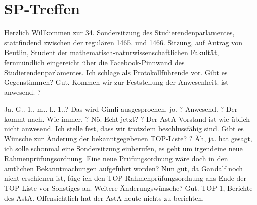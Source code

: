 \newpage
\section{SP-Treffen}
\label{sec:sp-treffen}
\charaktere{\Frodo, \Sum, \Gimli, \Legolars, \Elron, \Gandalf, \Galadriel}
\hauptbeamer{-}
\sound{-}
    

\begin{verseplay}[7em]
\s{\Elron} Herzlich Willkommen zur 34. Sondersitzung des Studierendenparlamentes, stattfindend zwischen der regulären 1465. und 1466. Sitzung, auf Antrag von \Frodo Beutlin, Student der mathematisch-naturwissenschaftlichen Fakultät, fernmündlich eingereicht über die Facebook-Pinnwand des Studierendenparlamentes. Ich schlage \Galadriel als Protokollführende vor. Gibt es Gegenstimmen?  Gut. Kommen wir zur Feststellung der Anwesenheit. \Galadriel ist anwesend. \Sum?
\end{verseplay}
\begin{verseplay}[7em]
\s{\Sum} Ja.
\s{\Elron} G.. 1.. m.. l.. 1..?
\s{\Gimli} Das wird Gimli ausgesprochen, jo.
\s{\Elron} \Legolars?
\s{\Legolars} Anwesend. 
\s{\Elron} \Gandalf?
\s{\Frodo} Der kommt nach.
\s{\Elron} Wie immer. \Frodo?
\s{\Frodo} Nö.
\s{\Elron} Echt jetzt? \Saruman?  Der AstA-Vorstand ist wie üblich nicht anwesend. Ich stelle fest, dass wir trotzdem beschlussfähig sind. Gibt es Wünsche zur Änderung der bekanntgegebenen TOP-Liste?  \Frodo?
\s{\Frodo} Äh, ja. \Gandalf hat gesagt, ich solle schonmal eine Sondersitzung einberufen, es geht um irgendeine neue Rahmenprüfungsordnung.
\s{\Elron} Eine neue Prüfungsordnung wäre doch in den amtlichen Bekanntmachungen aufgeführt worden?
\s{\Frodo} 
\s{\Elron} Nun gut, da Gandalf noch nicht erschienen ist, füge ich den TOP Rahmenprüfungsordnung ans Ende der TOP-Liste vor Sonstiges an. Weitere Änderungswünsche?  Gut. TOP 1, Berichte des AstA.  Offensichtlich hat der AstA heute nichts zu berichten.
\end{verseplay}
